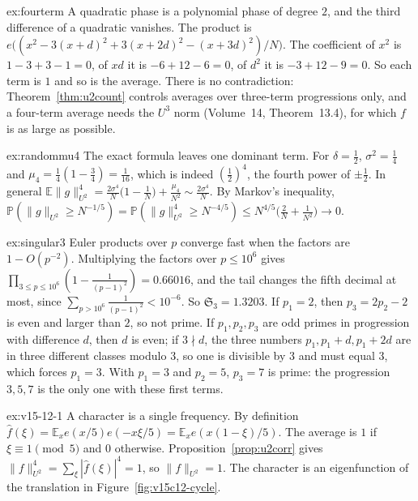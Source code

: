 \begin{solution}{ex:fourterm}
\idea A quadratic phase is a polynomial phase of degree $2$, and the third difference of a quadratic vanishes.
\writeup The product is $e\bigl((x^2-3(x+d)^2+3(x+2d)^2-(x+3d)^2)/N\bigr)$. The coefficient of $x^2$ is $1-3+3-1=0$, of $xd$ it is $-6+12-6=0$, of $d^2$ it is $-3+12-9=0$. So each term is $1$ and so is the average. There is no contradiction: Theorem~\ref{thm:u2count} controls averages over three-term progressions only, and a four-term average needs the $U^3$ norm (Volume~14, Theorem~13.4), for which $f$ is as large as possible.
\end{solution}

\begin{solution}{ex:randommu4}
\idea The exact formula leaves one dominant term.
\writeup For $\delta=\frac12$, $\sigma^2=\frac14$ and $\mu_4=\frac14(1-\frac34)=\frac1{16}$, which is indeed $(\frac12)^4$, the fourth power of $\pm\frac12$. In general $\mathbb E\|g\|_{U^2}^4=\frac{2\sigma^4}N\bigl(1-\frac1N\bigr)+\frac{\mu_4}{N^2}\sim\frac{2\sigma^4}N$. By Markov's inequality, $\mathbb P(\|g\|_{U^2}\ge N^{-1/5})=\mathbb P(\|g\|_{U^2}^4\ge N^{-4/5})\le N^{4/5}\bigl(\frac2N+\frac1{N^2}\bigr)\to0$.
\end{solution}

\begin{solution}{ex:singular3}
\idea Euler products over $p$ converge fast when the factors are $1-O(p^{-2})$.
\writeup Multiplying the factors over $p\le10^6$ gives $\prod_{3\le p\le10^6}(1-\frac1{(p-1)^2})=0.66016$, and the tail changes the fifth decimal at most, since $\sum_{p>10^6}\frac1{(p-1)^2}<10^{-6}$. So $\mathfrak S_3=1.3203$. If $p_1=2$, then $p_3=2p_2-2$ is even and larger than $2$, so not prime. If $p_1,p_2,p_3$ are odd primes in progression with difference $d$, then $d$ is even; if $3\nmid d$, the three numbers $p_1,p_1+d,p_1+2d$ are in three different classes modulo $3$, so one is divisible by $3$ and must equal $3$, which forces $p_1=3$. With $p_1=3$ and $p_2=5$, $p_3=7$ is prime: the progression $3,5,7$ is the only one with these first terms.
\end{solution}

\begin{solution}{ex:v15-12-1}
\idea A character is a single frequency.
\writeup By definition \(\hat f(\xi)=\mathbb E_x e(x/5)e(-x\xi/5)=\mathbb E_x e(x(1-\xi)/5)\). The average is \(1\) if \(\xi\equiv1\pmod5\) and \(0\) otherwise. Proposition~\ref{prop:u2corr} gives \(\|f\|_{U^2}^4=\sum_\xi|\hat f(\xi)|^4=1\), so \(\|f\|_{U^2}=1\). The character is an eigenfunction of the translation in Figure~\ref{fig:v15c12-cycle}.
\end{solution}

